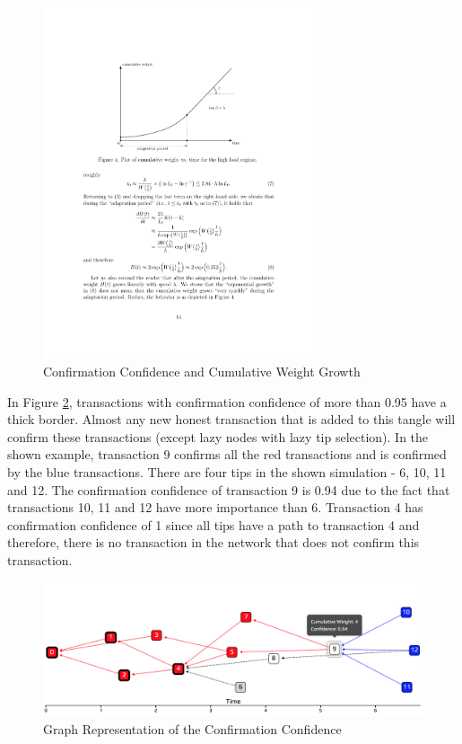 \begin{figure}[H]
    \centering
    \includegraphics[width=8cm]{images/confirmation-confidence.pdf}
    \caption{Confirmation Confidence and Cumulative Weight Growth \cite{the-tangle}}
    \label{fig:confirmation-confidence}
\end{figure}

In Figure \ref{fig:confirmation-confidence-tangle}, transactions with confirmation confidence of more than 0.95 have a thick border. Almost any new honest transaction that is added to this tangle will confirm these transactions (except lazy nodes with lazy tip selection). In the shown example, transaction 9 confirms all the red transactions and is confirmed by the blue transactions. There are four tips in the shown simulation - 6, 10, 11 and 12. The confirmation confidence of transaction 9 is 0.94 due to the fact that transactions 10, 11 and 12 have more importance than 6.
Transaction 4 has confirmation confidence of 1 since all tips have a path to transaction 4 and therefore, there is no transaction in the network that does not confirm this transaction.

\begin{figure}[H]
    \centering
    \includegraphics[width=1.0\textwidth]{images/confirmation-confidence-tangle.png}
    \caption{Graph Representation of the Confirmation Confidence}
    \label{fig:confirmation-confidence-tangle}
\end{figure}